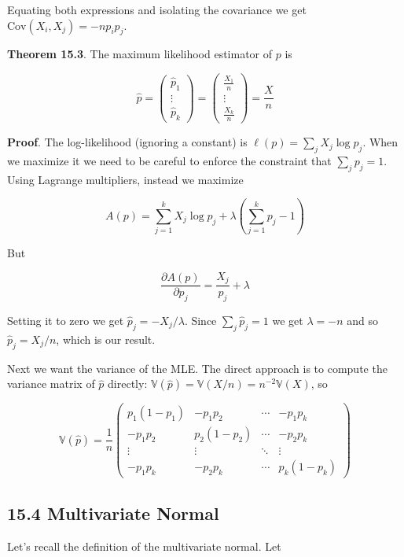Equating both expressions and isolating the covariance we get
\(\text{Cov}(X_i, X_j) = -np_ip_j\).

\textbf{Theorem 15.3}. The maximum likelihood estimator of \(p\) is

\[\hat{p} 
= \begin{pmatrix} \hat{p}_1 \\ \vdots \\ \hat{p}_k \end{pmatrix}
= \begin{pmatrix} \frac{X_1}{n} \\ \vdots \\ \frac{X_k}{n} \end{pmatrix}
= \frac{X}{n}
\]

\textbf{Proof}. The log-likelihood (ignoring a constant) is
\(\ell(p) = \sum_j X_j \log p_j\). When we maximize it we need to be
careful to enforce the constraint that \(\sum_j p_j = 1\). Using
Lagrange multipliers, instead we maximize

\[A(p) = \sum_{j=1}^k X_j \log p_j + \lambda \left( \sum_{j=1}^k p_j - 1 \right)\]

But

\[\frac{\partial A(p)}{\partial p_j} = \frac{X_j}{p_j} + \lambda\]

Setting it to zero we get \(\hat{p}_j = - X_j / \lambda\). Since
\(\sum_j \hat{p}_j = 1\) we get \(\lambda = -n\) and so
\(\hat{p}_j = X_j / n\), which is our result.

Next we want the variance of the MLE. The direct approach is to compute
the variance matrix of \(\hat{p}\) directly:
\(\mathbb{V}(\hat{p}) = \mathbb{V}(X / n) = n^{-2} \mathbb{V}(X)\), so

\[\mathbb{V}(\hat{p}) = \frac{1}{n} \begin{pmatrix}
p_1(1 - p_1) & -p_1p_2 & \cdots & -p_1p_k \\
-p_1p_2 & p_2(1 - p_2) & \cdots & -p_2p_k \\
\vdots & \vdots & \ddots & \vdots \\
-p_1p_k & -p_2p_k & \cdots & p_k(1 - p_k)
\end{pmatrix}\]

\subsection{15.4 Multivariate Normal}\label{multivariate-normal}

Let's recall the definition of the multivariate normal. Let

